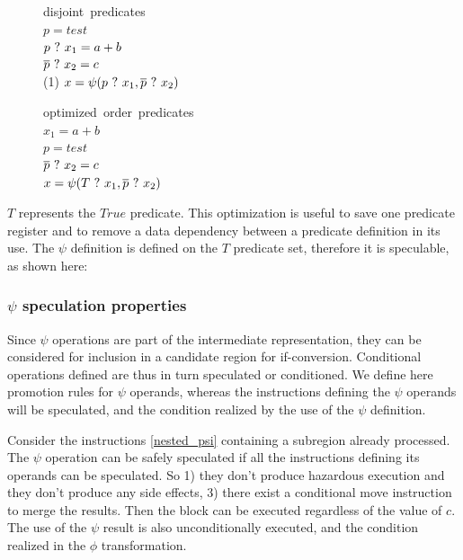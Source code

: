 \begin{figure}
\footnotesize
\begin{minipage}[t]{4cm}
\mbox{disjoint predicates} \\
$ p = test $ \\
$ p ~?~ x_1 = a + b $ \\
$ \overline{p} ~?~ x_2 = c $ \\
(1) $ x = \psi(p ~?~ x_1, \overline{p} ~?~ x_2) $ \\
\end{minipage}
\begin{minipage}[t]{4cm}
\mbox{optimized order predicates} \\
$ x_1 = a + b $ \\
$ p = test $ \\
$ \overline{p} ~?~ x_2 = c $ \\
$ x = \psi(T ~?~ x_1, \overline{p} ~?~ x_2) $ \\
\end{minipage}
\end{figure}

$T$ represents the $True$ predicate. This optimization is useful to save one predicate register and to remove a data dependency between a predicate definition in its use. 
The $\psi$ definition is defined on the $T$ predicate set, therefore it is speculable, as shown here:

\subsubsection{$\psi$ speculation properties}

Since $\psi$ operations are part of the intermediate representation, they can be considered for inclusion in a candidate region for if-conversion. Conditional operations defined are thus in turn speculated or conditioned. We define here promotion rules for $\psi$ operands, whereas the instructions defining the $\psi$ operands will be speculated, and the condition realized by the use of the $\psi$ definition.

Consider the instructions \ref{nested_psi} containing a subregion already processed. The $\psi$ operation can be safely speculated if all the instructions defining its operands can be speculated. So 1) they don't produce hazardous execution and they don't produce any side effects, 3) there exist a conditional move instruction to merge the results. Then the block can be executed regardless of the value of $c$. The use of the $\psi$ result is also unconditionally executed, and the condition realized in the $\phi$ transformation.

